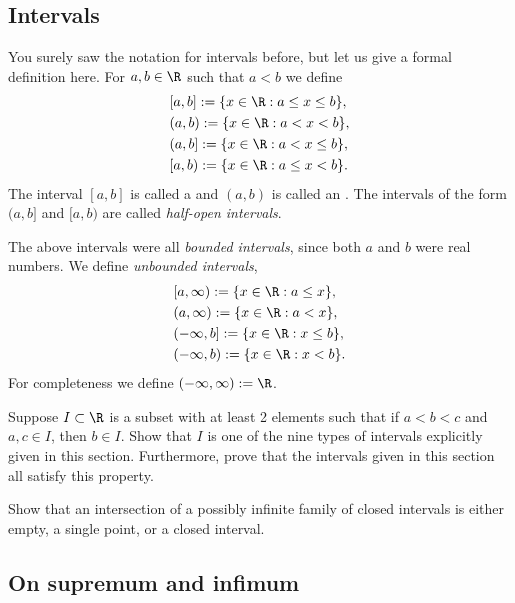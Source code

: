 \documentclass[12pt]{book}
\begin{document}
\subsection*{Intervals}

You surely saw the notation for intervals
before, but let us give a formal
definition here.
For $a,  b \in \R$ such that $a < b$ we define
\begin{align*}
& [a,b] := \{ x \in \R : a \leq x \leq b \}, \\
& (a,b) := \{ x \in \R : a < x < b \}, \\
& (a,b] := \{ x \in \R : a < x \leq b \}, \\
& [a,b) := \{ x \in \R : a \leq x < b \} .
\end{align*}
The interval $[a,b]$ is called a \emph{}
and $(a,b)$ is called an \emph{}.
The intervals
of the form $(a,b]$ and $[a,b)$ are called
\emph{half-open intervals}.

The above intervals were all \emph{bounded intervals}, since both $a$ and $b$ were real numbers.
We 
define \emph{unbounded intervals},
\begin{align*}
& [a,\infty) := \{ x \in \R : a \leq x \}, \\
& (a,\infty) := \{ x \in \R : a < x \}, \\
& (-\infty,b] := \{ x \in \R : x \leq b \}, \\
& (-\infty,b) := \{ x \in \R : x < b \} .
\end{align*}
For completeness we define $(-\infty,\infty) := \R$.


\begin{exercise} \label{exercise:intervaldef}
Suppose $I \subset \R$ is a subset with at least 2 elements
such that if $a < b < c$ and $a, c \in I$, then $b\in I$.
Show that $I$ is one of the nine types of intervals explicitly given in this section.
Furthermore, prove that the intervals given in this section
all satisfy this property.
\end{exercise}

\begin{exercise}
Show that an intersection
of a possibly infinite family of closed intervals is either empty, a single point,
or a closed interval.
\end{exercise}


\subsection*{On supremum and infimum}
\end{document}
